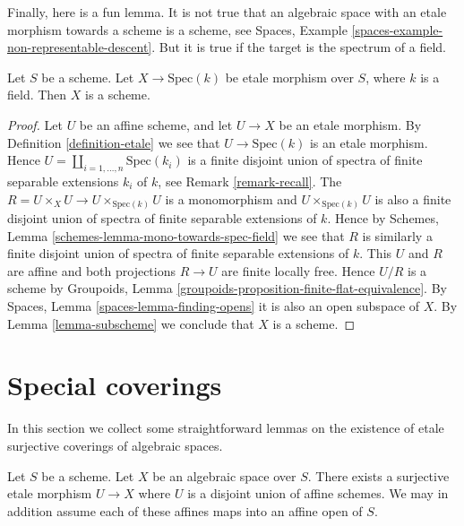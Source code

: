 \noindent
Finally, here is a fun lemma. It is not true that an algebraic space
with an etale morphism towards a scheme is a scheme, see
Spaces, Example \ref{spaces-example-non-representable-descent}.
But it is true if the target is the spectrum of a field.

\begin{lemma}
\label{lemma-etale-over-field-scheme}
Let $S$ be a scheme. Let $X \to \text{Spec}(k)$
be etale morphism over $S$, where $k$ is a field.
Then $X$ is a scheme.
\end{lemma}

\begin{proof}
Let $U$ be an affine scheme, and let $U \to X$ be an etale morphism. By
Definition \ref{definition-etale}
we see that $U \to \text{Spec}(k)$ is an etale
morphism. Hence $U = \coprod_{i = 1, \ldots, n} \text{Spec}(k_i)$
is a finite disjoint union of spectra of finite separable extensions
$k_i$ of $k$, see
Remark \ref{remark-recall}.
The $R = U \times_X U \to U \times_{\text{Spec}(k)} U$ is a monomorphism
and $U \times_{\text{Spec}(k)} U$ is also a finite disjoint union of
spectra of finite separable extensions of $k$. Hence by
Schemes, Lemma \ref{schemes-lemma-mono-towards-spec-field}
we see that $R$ is similarly a finite disjoint union of
spectra of finite separable extensions of $k$.
This $U$ and $R$ are affine and
both projections $R \to U$ are finite locally free.
Hence $U/R$ is a scheme by
Groupoids, Lemma \ref{groupoids-proposition-finite-flat-equivalence}.
By
Spaces, Lemma \ref{spaces-lemma-finding-opens}
it is also an open subspace of $X$. By
Lemma \ref{lemma-subscheme}
we conclude that $X$ is a scheme.
\end{proof}



\section{Special coverings}
\label{section-special-coverings}

\noindent
In this section we collect some straightforward lemmas on the existence
of etale surjective coverings of algebraic spaces.

\begin{lemma}
\label{lemma-cover-by-union-affines}
Let $S$ be a scheme.
Let $X$ be an algebraic space over $S$.
There exists a surjective etale morphism $U \to X$ where
$U$ is a disjoint union of affine schemes.
We may in addition assume each of these affines
maps into an affine open of $S$.
\end{lemma}

